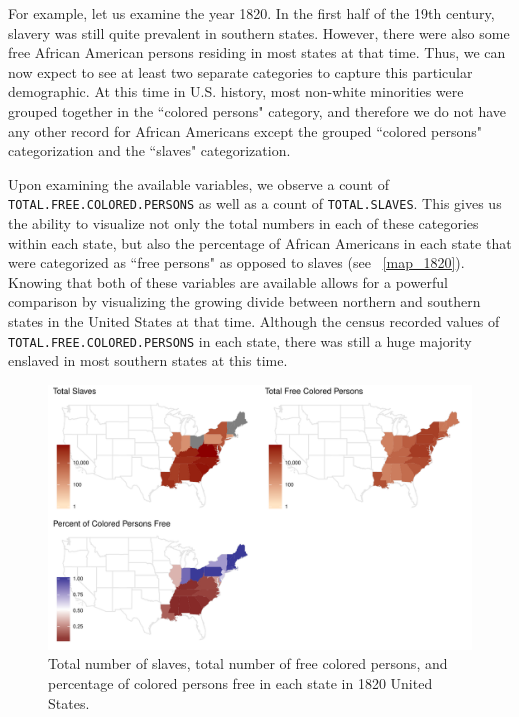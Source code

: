\documentclass[DIV=calc, paper=a4, fontsize=10pt, twocolumn]{scrartcl}\usepackage[]{graphicx}\usepackage[]{color}
\newenvironment{knitrout}{}{} %
\begin{document}
\par For example, let us examine the year 1820. In the first half of the 19th century, slavery was still quite prevalent in southern states. However, there were also some free African American persons residing in most states at that time. Thus, we can now expect to see at least two separate categories to capture this particular demographic. At this time in U.S. history, most non-white minorities were grouped together in the ``colored persons" category, and therefore we do not have any other record for African Americans except the grouped ``colored persons" categorization and the ``slaves" categorization. 

\par Upon examining the available variables, we observe a count of \texttt{TOTAL.FREE.COLORED.PERSONS} as well as a count of \texttt{TOTAL.SLAVES}. This gives us the ability to visualize not only the total numbers in each of these categories within each state, but also the percentage of African Americans in each state that were categorized as ``free persons" as opposed to slaves (see ~\autoref{map_1820}). Knowing that both of these variables are available allows for a powerful comparison by visualizing the growing divide between northern and southern states in the United States at that time. Although the census recorded values of \texttt{TOTAL.FREE.COLORED.PERSONS} in each state, there was still a huge majority enslaved in most southern states at this time.  


\begin{knitrout}
\color{fgcolor}\begin{figure}[h]
\includegraphics[width=.5\textwidth]{figure/map1820-1} \caption[Total number of slaves, total number of free colored persons, and percentage of colored persons free in each state in 1820 United States]{Total number of slaves, total number of free colored persons, and percentage of colored persons free in each state in 1820 United States.}\label{fig:map1820}
\end{figure}


\end{knitrout}
\end{document}
